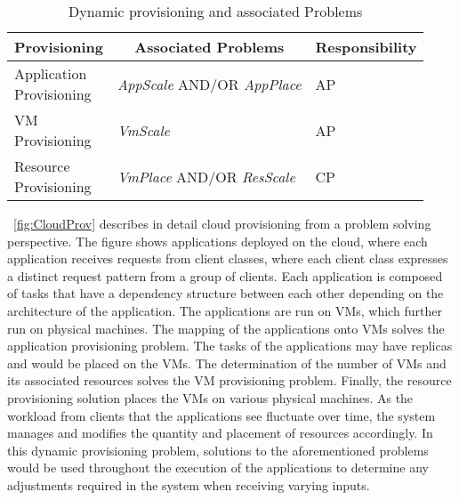 \documentclass[10pt,journal,cspaper,compsoc]{IEEEtran}
\newcommand{\heading}[1]{\multicolumn{1}{|c|}{\bfseries #1}}
\begin{document}
\begin{table}[h]
\caption{Dynamic provisioning and associated Problems}
\label{tab:DynProvAssocProblems}
\centering
\begin{tabular}{|l|l|l|}
\hline
\heading{Provisioning} & \heading{Associated Problems} & \heading{Responsibility} \\
\hline

\parbox[t]{0.5cm}{Application\\ Provisioning \strut}
& \emph{AppScale} AND/OR \emph{AppPlace} 
& AP\\
\hline

\parbox[t]{0.5cm}{VM\\ Provisioning  \strut}
& \emph{VmScale} 
& AP\\
\hline

\parbox[t]{0.5cm}{Resource\\ Provisioning  \strut}
& \emph{VmPlace} AND/OR \emph{ResScale} 
& CP \\
\hline
\end{tabular}
\end{table}

\figurename~\ref{fig:CloudProv} describes in detail cloud provisioning from a problem solving perspective. The figure shows  applications deployed on the cloud, where each application receives requests from  client classes, where each client class expresses a distinct request pattern from a group of clients. Each application is composed of  tasks that have a dependency structure between each other depending on the architecture of the application. The applications are run on  VMs, which further run on  physical machines. The mapping of the applications onto VMs solves the application provisioning problem. The tasks of the applications may have replicas and would be placed on the VMs. The determination of the number of VMs and its associated resources solves the VM provisioning problem. Finally, the resource provisioning solution places the VMs on various physical machines. As the workload from clients that the applications see fluctuate over time, the system manages and modifies the quantity and placement of resources accordingly. In this dynamic provisioning problem, solutions to the aforementioned problems would be used throughout the execution of the applications to determine any adjustments required in the system when receiving varying inputs.
\end{document}
